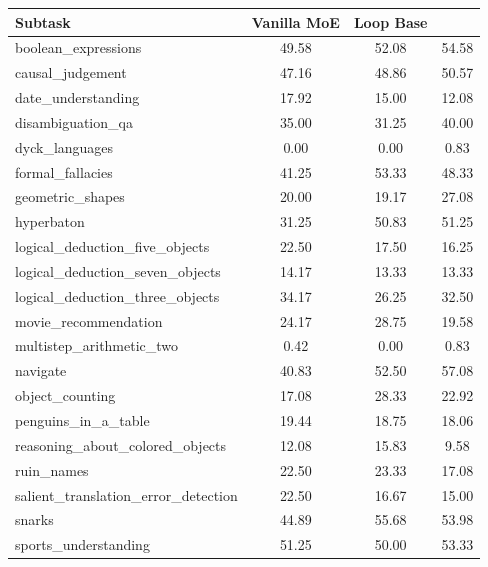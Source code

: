 \begin{table}[h]
\centering
\small
\setlength{\tabcolsep}{4pt}
\begin{tabular}{lccc}
\toprule
\textbf{Subtask} & \textbf{Vanilla MoE} & \textbf{Loop Base} & \textbf{\ourmodelnospace} \\
\midrule
boolean\_expressions                       & 49.58 & 52.08 & 54.58 \\
causal\_judgement                          & 47.16 & 48.86 & 50.57 \\
date\_understanding                        & 17.92 & 15.00 & 12.08 \\
disambiguation\_qa                         & 35.00 & 31.25 & 40.00 \\
dyck\_languages                            &  0.00 &  0.00 &  0.83 \\
formal\_fallacies                          & 41.25 & 53.33 & 48.33 \\
geometric\_shapes                          & 20.00 & 19.17 & 27.08 \\
hyperbaton                                 & 31.25 & 50.83 & 51.25 \\
logical\_deduction\_five\_objects          & 22.50 & 17.50 & 16.25 \\
logical\_deduction\_seven\_objects         & 14.17 & 13.33 & 13.33 \\
logical\_deduction\_three\_objects         & 34.17 & 26.25 & 32.50 \\
movie\_recommendation                      & 24.17 & 28.75 & 19.58 \\
multistep\_arithmetic\_two                 &  0.42 &  0.00 &  0.83 \\
navigate                                   & 40.83 & 52.50 & 57.08 \\
object\_counting                           & 17.08 & 28.33 & 22.92 \\
penguins\_in\_a\_table                     & 19.44 & 18.75 & 18.06 \\
reasoning\_about\_colored\_objects         & 12.08 & 15.83 &  9.58 \\
ruin\_names                                & 22.50 & 23.33 & 17.08 \\
salient\_translation\_error\_detection     & 22.50 & 16.67 & 15.00 \\
snarks                                     & 44.89 & 55.68 & 53.98 \\
sports\_understanding                      & 51.25 & 50.00 & 53.33 \\

\end{tabular}
\end{table}
